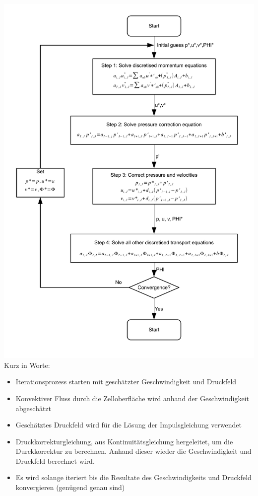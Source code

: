 \documentclass[a4paper]{scrartcl}
\begin{document}
\includegraphics[scale=0.7]{images/simple_algorithm.pdf}\\
Kurz in Worte:\\
\begin{itemize}
  \item Iterationsprozess starten mit geschätzter Geschwindigkeit und Druckfeld
  \item Konvektiver Fluss durch die Zelloberfläche wird anhand der
  Geschwindigkeit abgeschätzt
  \item Geschätztes Druckfeld wird für die Lösung der Impulsgleichung verwendet
  \item Druckkorrekturgleichung, aus Kontinuitätsgleichung hergeleitet, um die
  Durckkorrektur zu berechnen. Anhand dieser wieder die Geschwindigkeit und
  Druckfeld berechnet wird.
  \item Es wird solange iteriert bis die Resultate des Geschwindigkeits und
  Druckfeld konvergieren (genügend genau sind)
\end{itemize}
\end{document}
